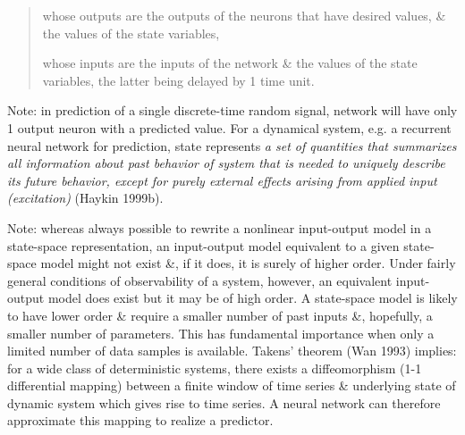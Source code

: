 \documentclass{article}
\begin{document}
\begin{enumerate}
\begin{itemize}
\begin{itemize}
\begin{quote}
				whose outputs are the outputs of the neurons that have desired values, \& the values of the state variables,
				
				whose inputs are the inputs of the network \& the values of the state variables, the latter being delayed by 1 time unit.
			\end{quote}
			Note: in prediction of a single discrete-time random signal, network will have only 1 output neuron with a predicted value. For a dynamical system, e.g. a recurrent neural network for prediction, state represents {\it a set of quantities that summarizes all information about past behavior of system that is needed to uniquely describe its future behavior, except for purely external effects arising from applied input (excitation)} (Haykin 1999b).
			
			Note: whereas always possible to rewrite a nonlinear input-output model in a state-space representation, an input-output model equivalent to a given state-space model might not exist \&, if it does, it is surely of higher order. Under fairly general conditions of observability of a system, however, an equivalent input-output model does exist but it may be of high order. A state-space model is likely to have lower order \& require a smaller number of past inputs \&, hopefully, a smaller number of parameters. This has fundamental importance when only a limited number of data samples is available. Takens' theorem (Wan 1993) implies: for a wide class of deterministic systems, there exists a diffeomorphism (1-1 differential mapping) between a finite window of time series \& underlying state of dynamic system which gives rise to time series. A neural network can therefore approximate this mapping to realize a predictor.
			

\end{itemize}
\end{itemize}
\end{enumerate}
\end{document}
